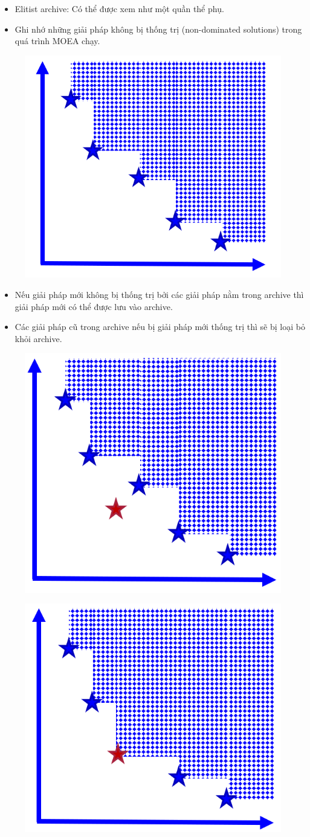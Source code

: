 \documentclass{book}
\begin{document}
\begin{itemize}
    \item Elitist archive: Có thể được xem như một quần thể phụ.
    \item Ghi nhớ những giải pháp không bị thống trị (non-dominated solutions) trong quá trình MOEA chạy.
\end{itemize}

\begin{figure}[H]
    \centering
    \includegraphics[width=0.5\linewidth]{images/GA-7-8_59.png}
\end{figure}

\begin{itemize}
    \item Nếu giải pháp mới không bị thống trị bởi các giải pháp nằm trong archive thì giải pháp mới có thể được lưu vào archive.
    \item Các giải pháp cũ trong archive nếu bị giải pháp mới thống trị thì sẽ bị loại bỏ khỏi archive.
\end{itemize}

\begin{figure}[H]
    \centering
    \includegraphics[width=0.5\linewidth]{images/GA-7-8_60.png}
\end{figure}

\begin{figure}[H]
    \centering
    \includegraphics[width=0.5\linewidth]{images/GA-7-8_61.png}
\end{figure}
\end{document}
